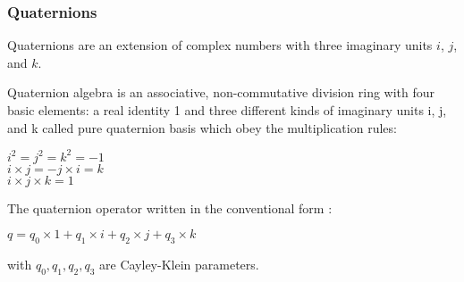 \label{definition}
\begin{frame}\frametitle{Quaternions}
Quaternions are an extension of complex numbers with three imaginary units $i$, $j$, and $k$.

Quaternion algebra is an associative, non-commutative division ring with four basic elements: a real identity 1 and three different kinds of imaginary units i, j, and k called pure quaternion basis which obey the multiplication rules:
\begin{center}

$ i^2 =j^2 = k^2 = -1$\\ $i\times j = -j\times i = k$ \\ $i \times j \times k=1 $
\end{center}
The quaternion operator written in the conventional form :
\begin{center}
$q=q_{0}\times 1+q_{1}\times i+q_{2}\times j+q_{3}\times k$

\end{center}

with $q_{0},q_{1},q_{2},q_{3}$ are Cayley-Klein parameters.
 

\end{frame}
